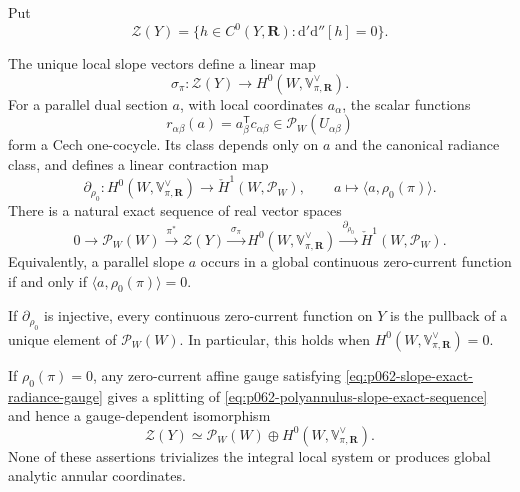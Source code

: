 Put
\[
 \mathscr Z(Y)=
 \{h\in C^0(Y,\mathbf R):\mathrm d'\mathrm d''[h]=0\}.
\]

\begin{proposition}
\label{prop:p062-polyannulus-slope-exact-sequence}
The unique local slope vectors define a linear map
\[
 \sigma_\pi:\mathscr Z(Y)
 \longrightarrow H^0(W,\mathbb V_{\pi,\mathbf R}^{\vee}).
\]
For a parallel dual section $a$, with local coordinates $a_\alpha$, the
scalar functions
\[
 r_{\alpha\beta}(a)=a_\beta^{\mathsf T}c_{\alpha\beta}
 \in\mathscr P_W(U_{\alpha\beta})
\]
form a Cech one-cocycle.  Its class depends only on $a$ and the canonical
radiance class, and defines a linear contraction map
\[
 \partial_{\rho_0}:H^0(W,\mathbb V_{\pi,\mathbf R}^{\vee})
 \longrightarrow\check H^1(W,\mathscr P_W),
 \qquad
 a\longmapsto\langle a,\rho_0(\pi)\rangle.
\]
There is a natural exact sequence of real vector spaces
\begin{equation}
\label{eq:p062-polyannulus-slope-exact-sequence}
 0\longrightarrow\mathscr P_W(W)
 \xrightarrow{\ \pi^*\ }\mathscr Z(Y)
 \xrightarrow{\ \sigma_\pi\ }
 H^0(W,\mathbb V_{\pi,\mathbf R}^{\vee})
 \xrightarrow{\ \partial_{\rho_0}\ }
 \check H^1(W,\mathscr P_W).
\end{equation}
Equivalently, a parallel slope $a$ occurs in a global continuous
zero-current function if and only if
$\langle a,\rho_0(\pi)\rangle=0$.

If $\partial_{\rho_0}$ is injective, every continuous zero-current function
on $Y$ is the pullback of a unique element of $\mathscr P_W(W)$.  In
particular, this holds when
$H^0(W,\mathbb V_{\pi,\mathbf R}^{\vee})=0$.

If $\rho_0(\pi)=0$, any zero-current affine gauge satisfying
\eqref{eq:p062-slope-exact-radiance-gauge} gives a splitting of
\eqref{eq:p062-polyannulus-slope-exact-sequence} and hence a
gauge-dependent isomorphism
\[
 \mathscr Z(Y)\simeq
 \mathscr P_W(W)\oplus
 H^0(W,\mathbb V_{\pi,\mathbf R}^{\vee}).
\]
None of these assertions trivializes the integral local system or produces
global analytic annular coordinates.
\end{proposition}
